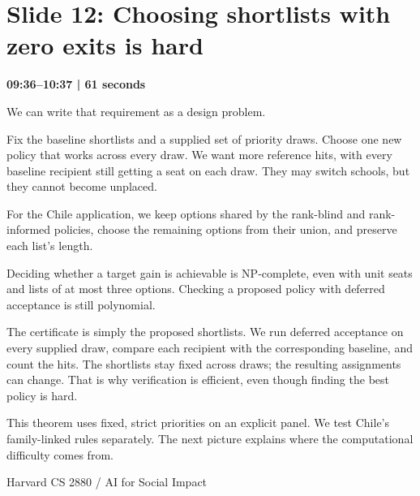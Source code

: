 \documentclass[11pt]{article}
\begin{document}
\section*{Slide 12: Choosing shortlists with zero exits is hard}
{\color{navy}\textbf{09:36--10:37 | 61 seconds}}\par\medskip
We can write that requirement as a design problem.
\par
Fix the baseline shortlists and a supplied set of priority draws. Choose one new policy that works across every draw. We want more reference hits, with every baseline recipient still getting a seat on each draw. They may switch schools, but they cannot become unplaced.
\par
For the Chile application, we keep options shared by the rank-blind and rank-informed policies, choose the remaining options from their union, and preserve each list's length.
\par
Deciding whether a target gain is achievable is NP-complete, even with unit seats and lists of at most three options. Checking a proposed policy with deferred acceptance is still polynomial.
\par
The certificate is simply the proposed shortlists. We run deferred acceptance on every supplied draw, compare each recipient with the corresponding baseline, and count the hits. The shortlists stay fixed across draws; the resulting assignments can change. That is why verification is efficient, even though finding the best policy is hard.
\par
This theorem uses fixed, strict priorities on an explicit panel. We test Chile's family-linked rules separately. The next picture explains where the computational difficulty comes from.
\par
\newpage
{\small Harvard CS 2880 / AI for Social Impact}\par
\end{document}
